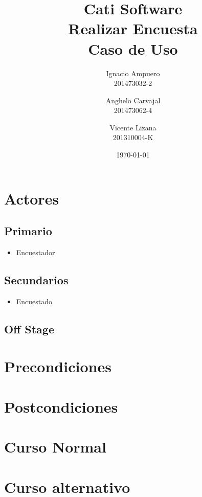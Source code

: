 \documentclass[fleqn]{article}
\title{\huge Cati Software\\ \Huge Realizar Encuesta\\ \Large Caso de Uso \vspace{30pt}}
\author{Ignacio Ampuero\\ 201473032-2 \and Anghelo Carvajal\\ 201473062-4 \and Vicente Lizana\\ 201310004-K}
\date{\today}
\begin{document}
\maketitle
\vspace{30pt}

\section{Actores}

	\subsection{Primario}
	
	\begin{itemize}
		\item Encuestador
	\end{itemize}
	
	\subsection{Secundarios}
	
	\begin{itemize}
		\item Encuestado
	\end{itemize}
	
	\subsection{Off Stage}

\section{Precondiciones}



\section{Postcondiciones}

\section{Curso Normal}

\section{Curso alternativo}
\end{document}
